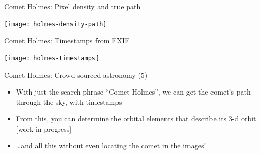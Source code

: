 \documentclass[compress]{beamer}
\begin{document}
\begin{frame}{Comet Holmes: Pixel density and true path}
    \begin{center}
    \texttt{[image: holmes-density-path]}
  \end{center}
\end{frame}

\begin{frame}{Comet Holmes: Timestamps from EXIF}
  \vspace{-1ex}
  \begin{center}
    \texttt{[image: holmes-timestamps]}
  \end{center}
\end{frame}

\begin{frame}{Comet Holmes: Crowd-sourced astronomy (5)}
  \begin{itemize}
    \item With just the search phrase ``\alert{Comet Holmes}'', we can
      get the comet's path through the sky, with timestamps
    \item From this, you can determine the \alert{orbital elements}
      that describe its 3-d orbit [work in progress]
    \item \ldots and all this without even locating the comet in the
      images!
  \end{itemize}
\end{frame}
\end{document}
